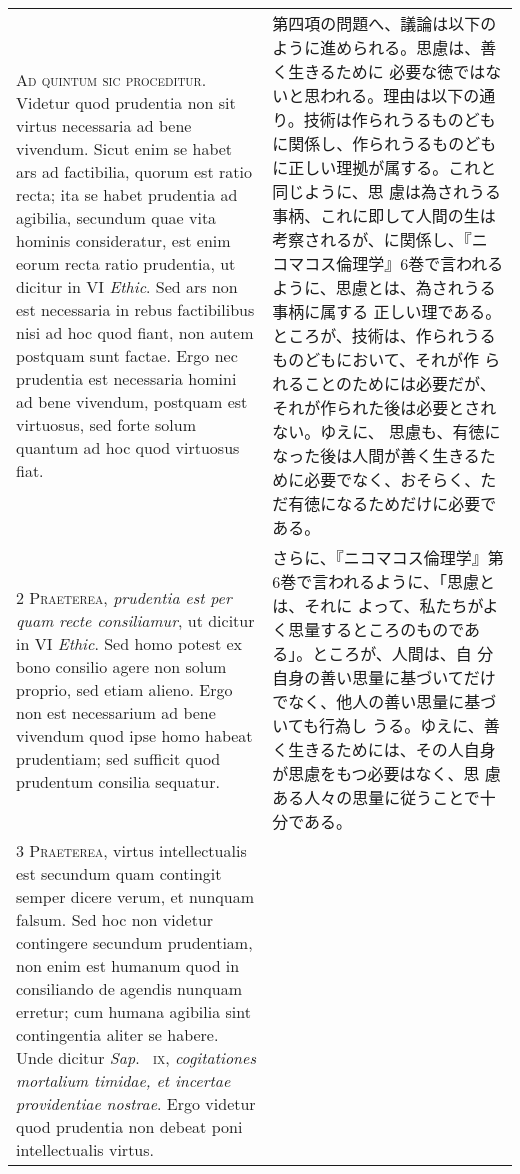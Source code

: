 \documentclass[10pt]{jsarticle}
\begin{document}
\begin{longtable}{p{21em}p{21em}}

{\huge A}{\scshape d quintum sic proceditur}. Videtur quod prudentia
 non sit virtus necessaria ad bene vivendum. Sicut enim se habet ars
 ad factibilia, quorum est ratio recta; ita se habet prudentia ad
 agibilia, secundum quae vita hominis consideratur, est enim eorum
 recta ratio prudentia, ut dicitur in VI {\itshape Ethic}. Sed ars non
 est necessaria in rebus factibilibus nisi ad hoc quod fiant, non
 autem postquam sunt factae. Ergo nec prudentia est necessaria homini
 ad bene vivendum, postquam est virtuosus, sed forte solum quantum ad
 hoc quod virtuosus fiat.

&

第四項の問題へ、議論は以下のように進められる。思慮は、善く生きるために
必要な徳ではないと思われる。理由は以下の通り。技術は作られうるものども
に関係し、作られうるものどもに正しい理拠が属する。これと同じように、思
慮は為されうる事柄、これに即して人間の生は考察されるが、に関係し、『ニ
コマコス倫理学』6巻で言われるように、思慮とは、為されうる事柄に属する
正しい理である。ところが、技術は、作られうるものどもにおいて、それが作
られることのためには必要だが、それが作られた後は必要とされない。ゆえに、
思慮も、有徳になった後は人間が善く生きるために必要でなく、おそらく、た
だ有徳になるためだけに必要である。

\\

{\scshape 2 Praeterea}, {\itshape prudentia est per quam recte
 consiliamur}, ut dicitur in VI {\itshape Ethic}. Sed homo potest ex
 bono consilio agere non solum proprio, sed etiam alieno. Ergo non est
 necessarium ad bene vivendum quod ipse homo habeat prudentiam; sed
 sufficit quod prudentum consilia sequatur.

&

さらに、『ニコマコス倫理学』第6巻で言われるように、「思慮とは、それに
よって、私たちがよく思量するところのものである」。ところが、人間は、自
分自身の善い思量に基づいてだけでなく、他人の善い思量に基づいても行為し
うる。ゆえに、善く生きるためには、その人自身が思慮をもつ必要はなく、思
慮ある人々の思量に従うことで十分である。

\\

{\scshape 3 Praeterea}, virtus intellectualis est secundum quam
contingit semper dicere verum, et nunquam falsum. Sed hoc non videtur
contingere secundum prudentiam, non enim est humanum quod in
consiliando de agendis nunquam erretur; cum humana agibilia sint
contingentia aliter se habere. Unde dicitur {\itshape Sap}.~{\scshape
ix}, {\itshape cogitationes mortalium timidae, et incertae
providentiae nostrae}. Ergo videtur quod prudentia non debeat poni
intellectualis virtus.


\end{longtable}
\end{document}
